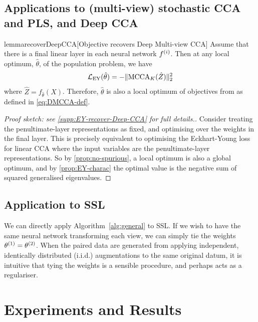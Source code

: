 \subsection{Applications to (multi-view) stochastic CCA and PLS, and Deep CCA}

\begin{restatable}{lemma}{recoverDeepCCA}[Objective recovers Deep Multi-view CCA]\label{lem:recover-DeepCCA}
Assume that there is a final linear layer in each neural network $f^{(i)}$.
Then at any local optimum, $\hat{\theta}$, of the population problem, we have
\begin{align*}
    \mathcal{L}_\text{EY}(\hat{\theta}) = - \lVert\operatorname{MCCA}_K(\hat{Z})\rVert_2^2
\end{align*}
where $\hat{Z} = f_{\hat{\theta}}(X)$.
Therefore, $\hat{\theta}$ is also a local optimum of objectives from \cite{andrew2013deep, somandepalli2019multimodal} as defined in \cref{eq:DMCCA-def}.
\end{restatable}
\begin{proof}[Proof sketch: see \cref{supp:EY-recover-Deep-CCA} for full details.]
    Consider treating the penultimate-layer representations as fixed, and optimising over the weights in the final layer.
    This is precisely equivalent to optimising the Eckhart-Young loss for linear CCA where the input variables are the penultimate-layer representations.
    So by \cref{prop:no-spurious}, a local optimum is also a global optimum, and by \cref{prop:EY-charac} the optimal value is the negative sum of squared generalised eigenvalues.
\end{proof}

\subsection{Application to SSL}
We can directly apply Algorithm~\ref{alg:general} to SSL\@.
If we wish to have the same neural network transforming each view, we can simply tie the weights $\theta^{(1)} = \theta^{(2)}$.
When the paired data are generated from applying independent, identically distributed (i.i.d.) augmentations to the same original datum, it is intuitive that tying the weights is a sensible procedure, and perhaps acts as a regulariser.


\section{Experiments and Results}


